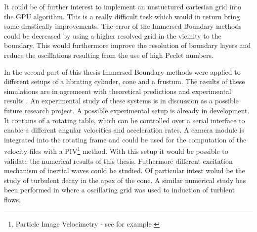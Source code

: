 It could be of further interest to implement an unstuctured cartesian grid into the GPU algorithm.
This is a really difficult task which would in return bring some drastically improvements.
The error of the Immersed Boundary methods could be decreased by using a higher resolved grid in the vicinity to the boundary.
This would furthermore  improve the resolution of boundary layers  and reduce the oscillations resulting from the use of high Peclet numbers.

In the second part of this thesis Immersed Boundary methods were applied to different setups of a librating cylinder, cone and a frustum.
The results of these simulations are in agremeent with theoretical
predictions \citep{Greenspan1969} and experimental results \cite{Beardsley1970}.
An experimental study of these systems is in discussion as a possible future research project.
A possible experimental setup is already in development.
It contains of a rotating table, which can be controlled over a serial interface to enable a different angular velocities and acceleration rates.
A camera module is integrated into the rotating frame and could be used for the computation
of the velocity files with a PIV\footnote{Particle Image Velocimetry  - see for example \citep{aie} }
method.
With this setup it would be possible to validate the numerical results of this thesis.
Futhermore different excitation mechanism of inertial waves could be studied.
Of particular intest wolud be the study of turbulent decay in the apex of the cone.
A similar numerical study has been performed in \citep{} where a oscillating grid
was used to induction of turblent flows.



